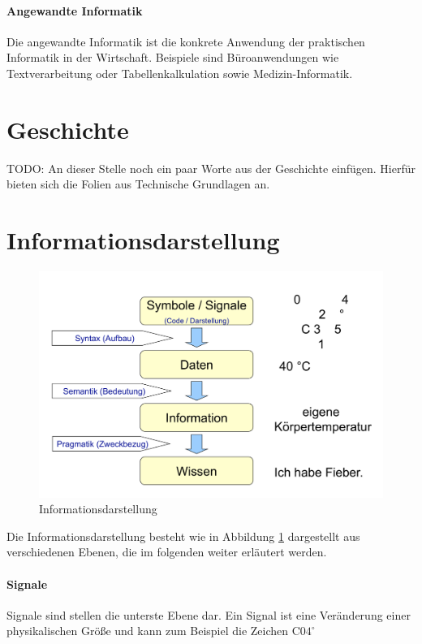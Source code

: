 \documentclass[../main.tex]{subfiles}
\begin{document}
        \paragraph{Angewandte Informatik}
            Die angewandte Informatik ist die konkrete Anwendung der praktischen Informatik in der Wirtschaft. Beispiele sind Büroanwendungen wie Textverarbeitung oder Tabellenkalkulation sowie Medizin-Informatik.
        
    \section{Geschichte}
        TODO: An dieser Stelle noch ein paar Worte aus der Geschichte einfügen. Hierfür bieten sich die Folien aus Technische Grundlagen an.
        
    \section{Informationsdarstellung}
        \begin{figure}
             \centering
             \includegraphics[width=\textwidth]{Abbildungen/Informationsdarstellung.png}
             \caption{Informationsdarstellung}
             \label{figure:Informatik:Grundlagen:informationsdarstellung}
        \end{figure}
    
        Die Informationsdarstellung besteht wie in Abbildung \ref{figure:Informatik:Grundlagen:informationsdarstellung} dargestellt aus verschiedenen Ebenen, die im folgenden weiter erläutert werden.
        
        \paragraph{Signale}
            Signale sind stellen die unterste Ebene dar. Ein Signal ist eine Veränderung einer physikalischen Größe und kann zum Beispiel die Zeichen C$04^\circ$
        
\end{document}
